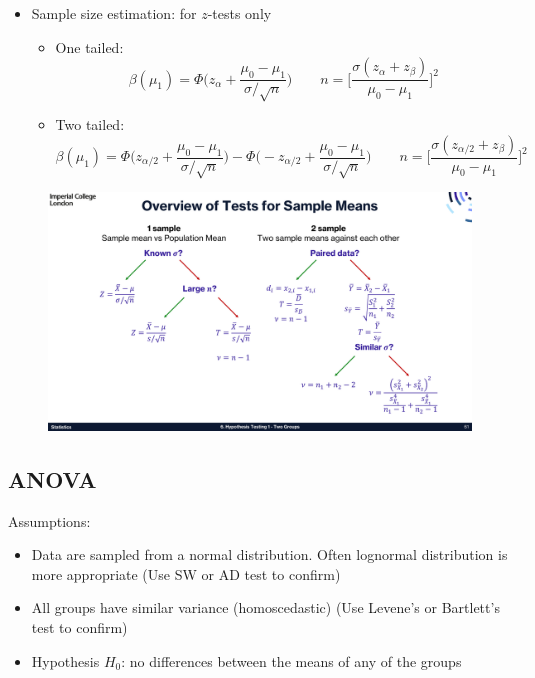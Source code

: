 \documentclass{article}
\begin{document}
\vspace{-.7cm}
\begin{itemize}
    \item Sample size estimation: for $z$-tests only
        \begin{itemize}
            \item One tailed:
            \[\beta(\mu_{1}) = \Phi\bigg( z_{\alpha}+\frac{\mu_{0}-\mu_{1}}{\sigma/\sqrt{n}} \bigg) \quad \quad n=\bigg[ \frac{\sigma(z_{\alpha}+z_{\beta})}{\mu_{0}-\mu_{1}}\bigg]^{2}\]
            \item Two tailed:
            \[\beta(\mu_{1}) = \Phi\bigg( z_{\alpha/2}+\frac{\mu_{0}-\mu_{1}}{\sigma/\sqrt{n}} \bigg)- \Phi\bigg( -z_{\alpha/2}+\frac{\mu_{0}-\mu_{1}}{\sigma/\sqrt{n}} \bigg) \quad \quad n=\bigg[ \frac{\sigma(z_{\alpha/2}+z_{\beta})}{\mu_{0}-\mu_{1}}\bigg]^{2}\]
        \end{itemize}
\end{itemize}
\vspace{-.3cm}
\begin{figure}[H]
    \centering
    \includegraphics[width=.65\textwidth]{./images/zTest_and_tTest.pdf}
\end{figure}

\vspace{-2cm}
\subsection*{ANOVA}
Assumptions:
\begin{itemize}
\item{Data are sampled from a normal distribution. Often lognormal distribution is more appropriate (Use SW or AD test to confirm)}
\item{All groups have similar variance (homoscedastic) (Use Levene’s or Bartlett’s test to confirm)}
\item{Hypothesis $H_{0}$: no differences between the means of any of the groups}
\end{itemize}
\end{document}
